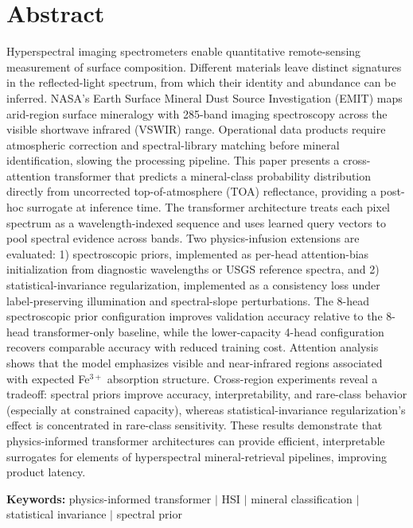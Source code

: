 \documentclass[11pt]{article}
\begin{document}
\section*{Abstract}
\noindent
Hyperspectral imaging spectrometers enable quantitative remote-sensing measurement of surface composition.
Different materials leave distinct signatures in the reflected-light spectrum, from which their identity and abundance can be inferred.
NASA's Earth Surface Mineral Dust Source Investigation (EMIT) maps arid-region surface mineralogy with 285-band imaging spectroscopy across the visible shortwave infrared (VSWIR) range.
Operational data products require atmospheric correction and spectral-library matching before mineral identification, slowing the processing pipeline. 
This paper presents a cross-attention transformer that predicts a mineral-class probability distribution directly from uncorrected top-of-atmosphere (TOA) reflectance, providing a post-hoc surrogate at inference time.
The transformer architecture treats each pixel spectrum as a wavelength-indexed sequence and uses learned query vectors to pool spectral evidence across bands. 
Two physics-infusion extensions are evaluated: 1) spectroscopic priors, implemented as per-head attention-bias initialization from diagnostic wavelengths or USGS reference spectra, and 2) statistical-invariance regularization, implemented as a consistency loss under label-preserving illumination and spectral-slope perturbations. 
The 8-head spectroscopic prior configuration improves validation accuracy relative to the 8-head transformer-only baseline, while the lower-capacity 4-head configuration recovers comparable accuracy with reduced training cost.
Attention analysis shows that the model emphasizes visible and near-infrared regions associated with expected Fe$^{3+}$ absorption structure. 
Cross-region experiments reveal a tradeoff: spectral priors improve accuracy, interpretability, and rare-class behavior (especially at constrained capacity), whereas statistical-invariance regularization's effect is concentrated in rare-class sensitivity. 
These results demonstrate that physics-informed transformer architectures can provide efficient, interpretable surrogates for elements of hyperspectral mineral-retrieval pipelines, improving product latency.
\vspace{1em}
\noindent

\textbf{Keywords:}  physics-informed transformer $\vert$ HSI $\vert$ mineral classification $\vert$ statistical invariance $\vert$ spectral prior  
\end{document}
